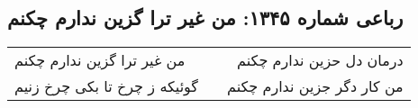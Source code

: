 \begin{center}
\section*{رباعی شماره ۱۳۴۵: من غیر ترا گزین ندارم چکنم}
\label{sec:1345}
\begin{longtable}{l p{0.5cm} r}
من غیر ترا گزین ندارم چکنم
&&
درمان دل حزین ندارم چکنم
\\
گوئیکه ز چرخ تا بکی چرخ زنیم
&&
من کار دگر جزین ندارم چکنم
\\
\end{longtable}
\end{center}
